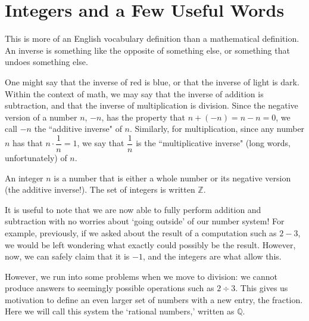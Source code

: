 \documentclass[openany]{book}
\begin{document}
\section{Integers and a Few Useful Words}
\begin{definition}[(Inverse)]
	This is more of an English vocabulary definition than a mathematical definition. An inverse is something like the opposite of something else, or something that undoes something else.
\end{definition}
\begin{example}[(Inverse)]
	One might say that the inverse of red is blue, or that the inverse of light is dark. Within the context of math, we may say that the inverse of addition is subtraction, and that the inverse of multiplication is division. Since the negative version of a number $n$, $-n$, has the property that $n+(-n) = n-n = 0$, we call $-n$ the ``additive inverse" of $n$. Similarly, for multiplication, since any number $n$ has that $n\cdot\dfrac{1}{n}=1$, we say that $\dfrac{1}{n}$ is the ``multiplicative inverse" (long words, unfortunately) of $n$.
\end{example}
\begin{definition}
	An integer $n$ is a number that is either a whole number or its negative version (the additive inverse!). The set of integers is written $\mathbb{Z}$.
\end{definition}
It is useful to note that we are now able to fully perform addition and subtraction with no worries about `going outside' of our number system! For example, previously, if we asked about the result of a computation such as $2-3$, we would be left wondering what exactly could possibly be the result. However, now, we can safely claim that it is $-1$, and the integers are what allow this.\par
However, we run into some problems when we move to division: we cannot produce answers to seemingly possible operations such as $2\div3$. This gives us motivation to define an even larger set of numbers with a new entry, the fraction. Here we will call this system the `rational numbers,' written as $\mathbb{Q}$.
\end{document}
